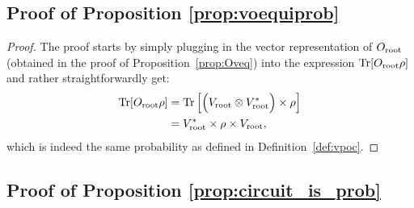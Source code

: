 \subsection{Proof of Proposition \ref{prop:voequiprob}}
\label{sec:proof:prop:voequiprob}

\propvoequiprob*





\begin{proof}
	The proof starts by simply plugging in the vector representation of $O_{\text{root}}$ (obtained in the proof of Proposition~\ref{prop:Oveq}) into the expression $\Tr [O_{\text{root}} \rho]$ and rather straightforwardly get:
	\begin{align}
		\Tr [O_{\text{root}} \rho]
		 &
		=
		\Tr \left[
			\Bigl(V_{\text{root}} \otimes V^*_{\text{root}}   \Bigr) \times \rho
			\right]
		\\
		 & = V^*_{\text{root}} \times  \rho \times V_{\text{root}},
	\end{align}
	which is indeed the same probability as defined in Definition~\ref{def:vpoc}.
\end{proof}


















\subsection{Proof of Proposition \ref{prop:circuit_is_prob}}
\label{app:circuit_is_prob}

\proplpcvalid*

